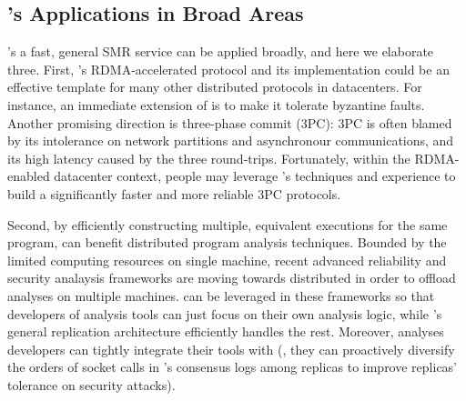 


\subsection{\xxx's Applications in Broad Areas}\label{sec:apps}

\xxx's a fast, general SMR service can be applied broadly, and 
here we elaborate three. First, \xxx's RDMA-accelerated \paxos protocol and its 
implementation could be an effective template for many other distributed 
protocols in datacenters. For instance, an immediate extension of \xxx is to 
make it tolerate byzantine faults. Another promising direction is three-phase 
commit (3PC): 3PC is often blamed by its intolerance on network partitions and 
asynchronour communications, and its high latency caused by the three 
round-trips. Fortunately, within the RDMA-enabled datacenter context, people may 
leverage \xxx's techniques and experience to build a significantly faster and 
more reliable 3PC protocols.


Second, by efficiently constructing multiple, equivalent executions for the 
same program, \xxx can benefit distributed program analysis techniques. Bounded 
by the limited computing resources on single machine, recent advanced 
reliability and security analaysis frameworks are moving towards distributed in 
order to offload analyses on multiple machines. \xxx can be leveraged in these 
frameworks so that developers of analysis tools can just focus on their own 
analysis logic, while \xxx's general replication architecture efficiently 
handles the rest. Moreover, analyses developers can tightly integrate their 
tools with \xxx (\eg, they can proactively diversify the orders of socket 
calls in \xxx's consensus logs among replicas to improve replicas' tolerance on
security attacks).


